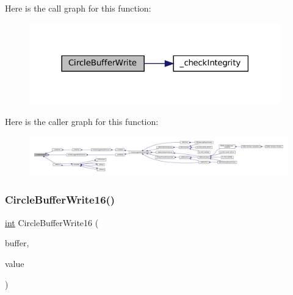Here is the call graph for this function\+:
\nopagebreak
\begin{figure}[H]
\begin{center}
\leavevmode
\includegraphics[width=309pt]{circle-buffer_8c_a296b8a91ed215aae7b8627c4f42ece8b_cgraph}
\end{center}
\end{figure}
Here is the caller graph for this function\+:
\nopagebreak
\begin{figure}[H]
\begin{center}
\leavevmode
\includegraphics[width=350pt]{circle-buffer_8c_a296b8a91ed215aae7b8627c4f42ece8b_icgraph}
\end{center}
\end{figure}
\mbox{\label{circle-buffer_8c_ababcf59a66d885ec2f94f1f189c49f9e}} 
\subsubsection{\texorpdfstring{Circle\+Buffer\+Write16()}{CircleBufferWrite16()}}
{\footnotesize\ttfamily \mbox{\hyperlink{ioapi_8h_a787fa3cf048117ba7123753c1e74fcd6}{int}} Circle\+Buffer\+Write16 (\begin{DoxyParamCaption}\item[{struct Circle\+Buffer $\ast$}]{buffer,  }\item[{int16\+\_\+t}]{value }\end{DoxyParamCaption})}

